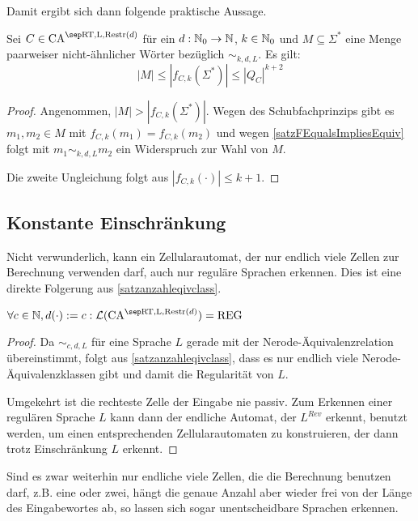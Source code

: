 Damit ergibt sich dann folgende praktische Aussage.

\begin{corollary}
    \label{satzanzahleqivclass}
    Sei $C \in \CAM{\CART, \CALeft, \CARestr(d)}$ für ein $d: \mathbb{N}_0 \to \mathbb{N}$, $k \in \mathbb{N}_0$ und
    $M \subseteq \Sigma^*$ eine Menge paarweiser nicht-ähnlicher Wörter bezüglich $\sim_{k,d,L}$. Es gilt:
    \[
        |M| \leq |f_{C, k}(\Sigma^*)| \leq |Q_C|^{k + 2}
    \]
\end{corollary}
\begin{proof}
    Angenommen, $|M| > |f_{C, k}(\Sigma^*)|$. Wegen des Schubfachprinzips gibt es $m_1, m_2 \in M$ mit $f_{C,k}(m_1) = f_{C,k}(m_2)$ und wegen \cref{satzFEqualsImpliesEquiv} folgt mit $m_1 \sim_{k,d,L} m_2$ ein Widerspruch zur Wahl von $M$.
    
    Die zweite Ungleichung folgt aus $|f_{C,k}(\cdot)| \leq k + 1$.
\end{proof}

\subsection{Konstante Einschränkung}

Nicht verwunderlich, kann ein Zellularautomat, der nur endlich viele Zellen zur Berechnung verwenden darf,
auch nur reguläre Sprachen erkennen. Dies ist eine direkte Folgerung aus \cref{satzanzahleqivclass}.

\begin{satz}
    $\forall c \in \N, d(\cdot) := c: \CAL{\CART, \CALeft, \CARestr(d)} = \textrm{REG}$
\end{satz}
\begin{proof}
    Da $\sim_{c,d,L}$ für eine Sprache $L$ gerade mit der Nerode-Äquivalenzrelation übereinstimmt,
    folgt aus \cref{satzanzahleqivclass}, dass es nur endlich viele Nerode-Äquivalenzklassen gibt und damit die Regularität von $L$.
    
    Umgekehrt ist die rechteste Zelle der Eingabe nie passiv.
    Zum Erkennen einer regulären Sprache $L$ kann dann der endliche Automat, der $L^{Rev}$ erkennt, benutzt werden,
    um einen entsprechenden Zellularautomaten zu konstruieren, der dann trotz Einschränkung $L$ erkennt.
\end{proof}

Sind es zwar weiterhin nur endliche viele Zellen, die die Berechnung benutzen darf,
\acs{z.B.} eine oder zwei, hängt die genaue Anzahl
aber wieder frei von der Länge des Eingabewortes ab,
so lassen sich sogar unentscheidbare Sprachen erkennen.

